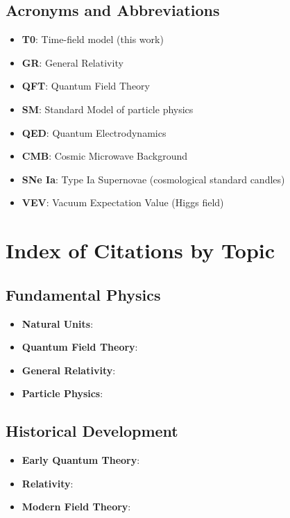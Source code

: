 \documentclass[12pt,a4paper]{article}
\begin{document}
	\subsection{Acronyms and Abbreviations}
	\label{app:abbreviations}
	
	\begin{itemize}
		\item \textbf{T0}: Time-field model (this work)
		\item \textbf{GR}: General Relativity \citep{einstein1915,misner1973}
		\item \textbf{QFT}: Quantum Field Theory \citep{weinberg1995,peskin1995}
		\item \textbf{SM}: Standard Model of particle physics \citep{weinberg2003}
		\item \textbf{QED}: Quantum Electrodynamics \citep{feynman1985,peskin1995}
		\item \textbf{CMB}: Cosmic Microwave Background \citep{planck2020}
		\item \textbf{SNe Ia}: Type Ia Supernovae (cosmological standard candles)
		\item \textbf{VEV}: Vacuum Expectation Value (Higgs field)
	\end{itemize}
	
	\section*{Index of Citations by Topic}
	\label{app:citation_index}
	
	\subsection*{Fundamental Physics}
	\begin{itemize}
		\item \textbf{Natural Units}: \citet{planck1900,planck1906,weinberg1995,peskin1995}
		\item \textbf{Quantum Field Theory}: \citet{weinberg1995,peskin1995,srednicki2007,zee2010}
		\item \textbf{General Relativity}: \citet{einstein1915,misner1973,carroll2004,wald1984}
		\item \textbf{Particle Physics}: \citet{griffiths2008,perkins2000,weinberg2003}
	\end{itemize}
	
	\subsection*{Historical Development}
	\begin{itemize}
		\item \textbf{Early Quantum Theory}: \citet{planck1900,bohr1913,heisenberg1927,debroglie1924}
		\item \textbf{Relativity}: \citet{einstein1905,einstein1915,schwarzschild1916}
		\item \textbf{Modern Field Theory}: \citet{weinberg1967,salam1968,higgs1964,englert1964}
	\end{itemize}
	
\end{document}
